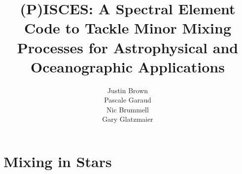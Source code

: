 \documentclass{beamer}
\begin{document}
\title[(P)ISCES]{(P)ISCES: A Spectral Element Code to Tackle Minor Mixing Processes for Astrophysical and Oceanographic Applications}
\author{Justin Brown \\ Pascale Garaud \\ Nic Brummell \\ Gary Glatzmaier}


\section{Mixing in Stars}

\frame{\tableofcontents[hideothersubsections]}


\end{document}

